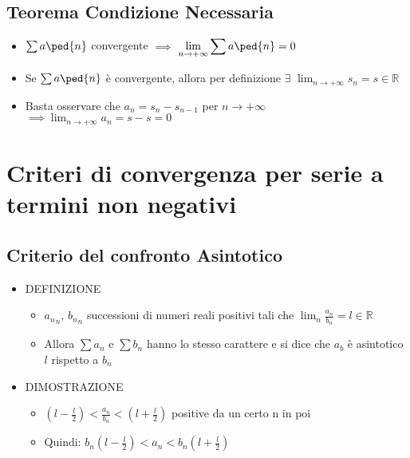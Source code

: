 \documentclass[10pt]{article}
\begin{document}
\subsection{Teorema Condizione Necessaria}
\begin{itemize}
\item
$ \sum a\ped{n} $ convergente $\implies$ $\displaystyle{\lim_{n \to +\infty}{\sum a\ped{n}}} = 0 $
\item
Se $ \sum a\ped{n} $ è convergente, allora per definizione $\exists$ $ \displaystyle{\lim_{n \to +\infty}{s_n = s} \in \mathbb{R}}$
\item
Basta osservare che $a_n = s_n - s_{n-1}$ per $n \to + \infty$
\subitem
$\implies \displaystyle{\lim_{n \to +\infty}{a_n = s - s = 0}}$
\end{itemize}
\section{Criteri di convergenza per serie a termini non negativi}
\subsection{Criterio del confronto Asintotico}
\begin{itemize}
\item
DEFINIZIONE
\begin{itemize}
\item
${a_n}_n$, ${b_n}_n$ successioni di numeri reali positivi tali che $\displaystyle{ \lim_{n}{\frac{a_n}{b_n} = l \in \mathbb{R}}}$
\item
Allora $\sum a_n$ e $\sum b_n$ hanno lo stesso carattere e si dice che $a_b$ è asintotico $l$ rispetto a $b_n$
\end{itemize}\medskip \smallskip
\item 
DIMOSTRAZIONE
\begin{itemize}
\item
$\displaystyle{\left(l - \frac{l}{2}\right) < \frac{a_n}{b_n} < \left(l + \frac{l}{2}\right)}$ positive da un certo n in poi
\item
Quindi: $\displaystyle{b_n \left(l - \frac{l}{2}\right) < a_n < b_n \left(l + \frac{l}{2}\right)}$
\end{itemize}
\end{itemize}
\medskip
\end{document}
